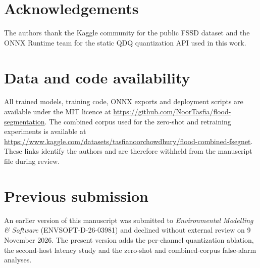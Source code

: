 \documentclass[12pt]{article}
\begin{document}
\section*{Acknowledgements}
The authors thank the Kaggle community for the public FSSD dataset and the ONNX Runtime team for the static QDQ quantization API used in this work.

\section*{Data and code availability}
All trained models, training code, ONNX exports and deployment scripts are available under the MIT licence at \url{https://github.com/NoorTasfia/flood-segmentation}. The combined corpus used for the zero-shot and retraining experiments is available at \url{https://www.kaggle.com/datasets/tasfianoorchowdhury/flood-combined-fsegnet}. These links identify the authors and are therefore withheld from the manuscript file during review.

\section*{Previous submission}
An earlier version of this manuscript was submitted to \emph{Environmental Modelling \& Software} (ENVSOFT-D-26-03981) and declined without external review on 9 November 2026. The present version adds the per-channel quantization ablation, the second-host latency study and the zero-shot and combined-corpus false-alarm analyses.
\end{document}

